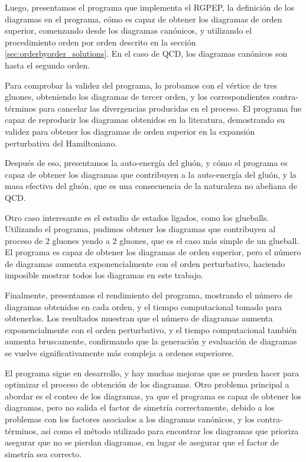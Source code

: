 \documentclass[11pt,a4paper,twoside,pdf]{article}
\numberwithin{equation}{section}
\begin{document}
Luego, presentamos el programa que implementa el RGPEP, la definici\'on de los diagramas
en el programa, c\'omo es capaz de obtener los diagramas de orden superior, comenzando
desde los diagramas can\'onicos, y utilizando el procedimiento orden por orden descrito en la secci\'on
\ref{sec:orderbyorder_solutions}. En el caso de QCD, los diagramas can\'onicos son hasta
el segundo orden.

Para comprobar la validez del programa, lo probamos con el v\'ertice de tres gluones,
obteniendo los diagramas de tercer orden, y los correspondientes contra-t\'erminos para cancelar
las divergencias producidas en el proceso. El programa fue capaz de reproducir los
diagramas obtenidos en la literatura, demostrando su validez para obtener los
diagramas de
orden superior en la expansi\'on perturbativa del Hamiltoniano.

Despu\'es de eso, presentamos la auto-energ\'ia del glu\'on, y c\'omo el programa es capaz de
obtener los diagramas que contribuyen a la auto-energ\'ia del glu\'on, y la masa efectiva
del glu\'on, que es una consecuencia de la naturaleza no abeliana de QCD.

Otro caso interesante es el estudio de estados ligados, como los glueballs.
Utilizando el programa, pudimos obtener los diagramas que contribuyen al proceso
de 2 gluones yendo a 2 gluones, que es el caso m\'as simple de un glueball.
El programa es capaz de obtener los diagramas de orden superior, pero el n\'umero de
diagramas aumenta exponencialmente con el orden perturbativo, haciendo imposible
mostrar todos los diagramas en este trabajo.

Finalmente, presentamos el rendimiento del programa, mostrando el n\'umero de diagramas
obtenidos en cada orden, y el tiempo computacional tomado para obtenerlos. Los resultados
muestran que el n\'umero de diagramas aumenta exponencialmente con el orden perturbativo,
y el tiempo computacional tambi\'en aumenta bruscamente, confirmando que la generaci\'on
y evaluaci\'on de diagramas se vuelve significativamente m\'as compleja a ordenes superiores.

El programa sigue en desarrollo, y hay muchas mejoras que se pueden hacer para optimizar
el proceso de obtenci\'on de los diagramas. Otro problema principal a abordar es el conteo
de los diagramas, ya que el programa es capaz de obtener los diagramas,
pero no
salida el factor de simetr\'ia correctamente, debido a los problemas con los factores
asociados a los diagramas can\'onicos, y los contra-t\'erminos, as\'i como el m\'etodo
utilizado para encontrar los diagramas que prioriza asegurar que no se pierdan diagramas, en lugar de
asegurar que el factor de simetr\'ia sea correcto.
\end{document}
